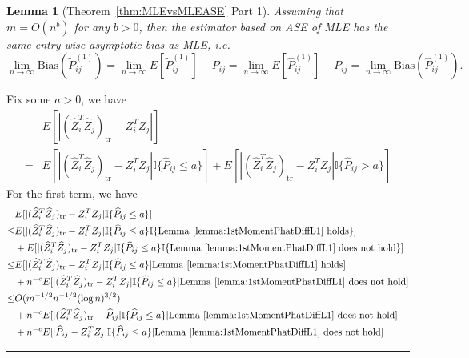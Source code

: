 \documentclass[a4paper]{article}
\newenvironment{proof}{{\bf Proof:  }}{\hfill\rule{2mm}{2mm}}
\newtheorem{lemma}[fact]{Lemma}
\renewcommand{\hat}{\widehat}
\begin{document}
\begin{lemma}[Theorem~\ref{thm:MLEvsMLEASE} Part 1]
\label{lm:L1Consistentproof}
Assuming that $m = O(n^b)$ for any $b > 0$, then the estimator based on ASE of MLE has the same entry-wise asymptotic bias as MLE, i.e.
\[
	\lim_{n \to \infty} \mathrm{Bias}(\widetilde{P}_{ij}^{(1)}) = \lim_{n \to \infty} E[\widetilde{P}_{ij}^{(1)}] - P_{ij} = \lim_{n \to \infty} E[\hat{P}^{(1)}_{ij}] - P_{ij}
    = \lim_{n \to \infty} \mathrm{Bias}(\hat{P}_{ij}^{(1)}).
\]
\end{lemma}
\begin{proof}
Fix some $a > 0$, we have
\begin{align*}
	& E[|(\hat{Z}_i^T \hat{Z}_j)_{\mathrm{tr}} - Z_i^T Z_j|] \\
	= & E[|(\hat{Z}_i^T \hat{Z}_j)_{\mathrm{tr}} - Z_i^T Z_j| \mathbb{I}\{\hat{P}_{ij} \le a\}]
	+ E[|(\hat{Z}_i^T \hat{Z}_j)_{\mathrm{tr}} - Z_i^T Z_j| \mathbb{I}\{\hat{P}_{ij} > a\}]
\end{align*}
For the first term, we have
\begin{align*}
	& E[|(\hat{Z}_i^T \hat{Z}_j)_{\mathrm{tr}} - Z_i^T Z_j| \mathbb{I}\{\hat{P}_{ij} \le a\}] \\
	\le & E[|(\hat{Z}_i^T \hat{Z}_j)_{\mathrm{tr}} - Z_i^T Z_j| \mathbb{I}\{\hat{P}_{ij} \le a\} \mathbb{I}\{\mathrm{Lemma\ } \ref{lemma:1stMomentPhatDiffL1} \mathrm{\ holds}\}] \\
	& + E[|(\hat{Z}_i^T \hat{Z}_j)_{\mathrm{tr}} - Z_i^T Z_j| \mathbb{I}\{\hat{P}_{ij} \le a\} \mathbb{I}\{\mathrm{Lemma\ } \ref{lemma:1stMomentPhatDiffL1} \mathrm{\ does\ not\ hold}\}] \\
	\le & E[|(\hat{Z}_i^T \hat{Z}_j)_{\mathrm{tr}} - Z_i^T Z_j| \mathbb{I}\{\hat{P}_{ij} \le a\} | \mathrm{Lemma\ } \ref{lemma:1stMomentPhatDiffL1} \mathrm{\ holds}] \\
	& + n^{-c} E[|(\hat{Z}_i^T \hat{Z}_j)_{\mathrm{tr}} - Z_i^T Z_j| \mathbb{I}\{\hat{P}_{ij} \le a\} | \mathrm{Lemma\ } \ref{lemma:1stMomentPhatDiffL1} \mathrm{\ does\ not\ hold}] \\
	\le & O(m^{-1/2} n^{-1/2} (\log n)^{3/2}) \\
	& + n^{-c} E[|(\hat{Z}_i^T \hat{Z}_j)_{\mathrm{tr}} - \hat{P}_{ij}| \mathbb{I}\{\hat{P}_{ij} \le a\}| \mathrm{Lemma\ } \ref{lemma:1stMomentPhatDiffL1} \mathrm{\ does\ not\ hold}] \\
	& + n^{-c} E[|\hat{P}_{ij} - Z_i^T Z_j| \mathbb{I}\{\hat{P}_{ij} \le a\}| \mathrm{Lemma\ } \ref{lemma:1stMomentPhatDiffL1} \mathrm{\ does\ not\ hold}] \\

\end{align*}
\end{proof}
\end{document}
